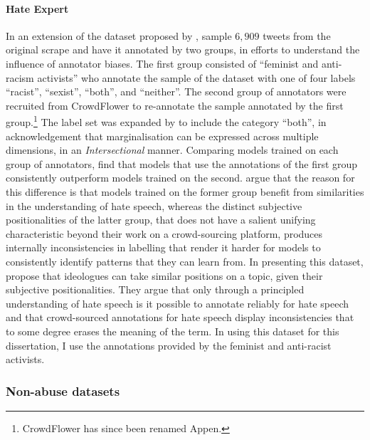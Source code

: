 \paragraph{Hate Expert} In an extension of the dataset proposed by \citet{Waseem-Hovy:2016}, \citet{Waseem:2016} sample $6,909$ tweets from the original scrape and have it annotated by two groups, in efforts to understand the influence of annotator biases. The first group consisted of ``feminist and anti-racism activists'' \citep{Waseem:2016} who annotate the sample of the dataset with one of four labels ``racist'', ``sexist'', ``both'', and ``neither''. The second group of annotators were recruited from CrowdFlower to re-annotate the sample annotated by the first group.\footnote{CrowdFlower has since been renamed Appen.}
The label set was expanded by \citet{Waseem:2016} to include the category ``both'', in acknowledgement that marginalisation can be expressed across multiple dimensions, in an \textit{Intersectional} manner. Comparing models trained on each group of annotators, \citet{Waseem:2016} find that models that use the annotations of the first group consistently outperform models trained on the second. \citet{Waseem:2016} argue that the reason for this difference is that models trained on the former group benefit from similarities in the understanding of hate speech, whereas the distinct subjective positionalities of the latter group, that does not have a salient unifying characteristic beyond their work on a crowd-sourcing platform, produces internally inconsistencies in labelling that render it harder for models to consistently identify patterns that they can learn from.
In presenting this dataset, \citet{Waseem:2016} propose that ideologues can take similar positions on a topic, given their subjective positionalities. They argue that only through a principled understanding of hate speech is it possible to annotate reliably for hate speech and that crowd-sourced annotations for hate speech display inconsistencies that to some degree erases the meaning of the term.
In using this dataset for this dissertation, I use the annotations provided by the feminist and anti-racist activists.

\citep{Davidson:2017}
\citep{Wulczyn:2017}
\citep{Garcia:2019}

\subsubsection{Non-abuse datasets}
\citep{Oraby_sarcasm:2017}
\citep{Oraby_fact_feel:2017}
\citep{Hoover:2019}

